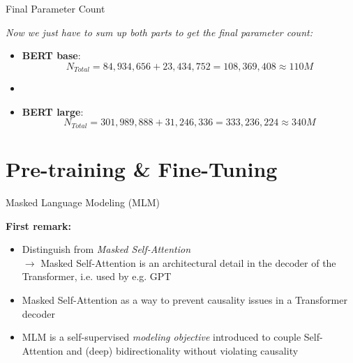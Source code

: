 
\begin{frame}{Final Parameter Count}

\bigskip

\textit{Now we just have to sum up both parts to get the final parameter count:}

\bigskip

\begin{itemize}
	\item \textbf{BERT base}: 
	$$N_{Total} = 84,934,656 + 23,434,752 = 108,369,408 \approx 110M$$
	\item[]
	\item \textbf{BERT large}:
	$$N_{Total} = 301,989,888 + 31,246,336 = 333,236,224 \approx 340M$$
\end{itemize}
	
\end{frame}



\section{Pre-training \& Fine-Tuning}

\begin{frame}{Masked Language Modeling (MLM)}

\vfill

\textbf{First remark:}

\begin{itemize}
	\item Distinguish from \textit{Masked Self-Attention}\\ 
				$\to$ Masked Self-Attention is an architectural detail in the decoder of the Transformer, i.e. used by e.g. GPT
	\item Masked Self-Attention as a way to prevent causality issues in a Transformer decoder 
	\item MLM is a self-supervised \textit{modeling objective} introduced to couple Self-Attention and (deep) bidirectionality without violating causality
\end{itemize}

\vfill

\end{frame}

